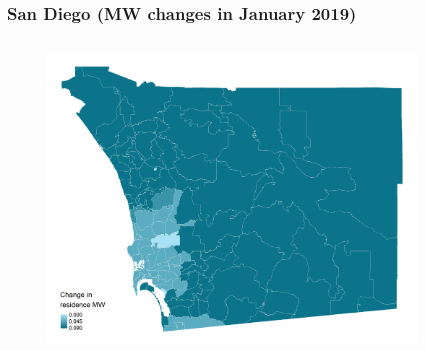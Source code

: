 \documentclass[aspectratio=169, t]{beamer}
\begin{document}
\begin{frame}[label = bay_example]
\begin{columns}
\begin{column}{0.50\textwidth}
\begin{figure}
            \end{figure}   
        \end{column}
    \end{columns}
    \hyperlink{chi_example}{}
\end{frame}


\begin{frame}[label = san_diego_example]
\frametitle{San Diego (MW changes in January 2019)}
    \begin{columns}
        \begin{column}{0.50\textwidth}
            \vspace{-4mm}
            \begin{figure}
                \centering
                \includegraphics[scale = 0.36]{maps_events/output/san_diego_2018-12_statutory_mw.png}
            \end{figure}   
        \end{column}
        \begin{column}{0.50\textwidth}
            \vspace{-4mm}
            \begin{figure}
                \centering

\end{figure}
\end{column}
\end{columns}
\end{frame}
\end{document}
